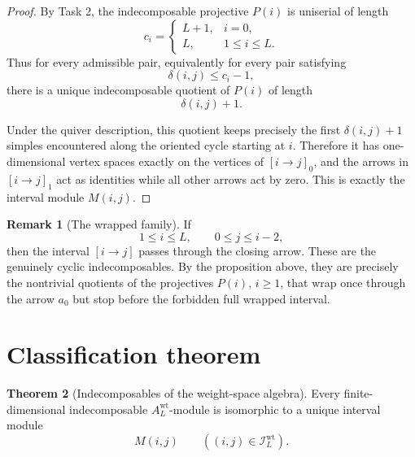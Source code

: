 \documentclass{article}
\theoremstyle{definition}
\newtheorem{theorem}{Theorem}[section]
\newtheorem{remark}[theorem]{Remark}
\begin{document}
\begin{proof}
By Task 2, the indecomposable projective $P(i)$ is uniserial of length
\[
c_i=
\begin{cases}
L+1, & i=0,\\
L, & 1\le i\le L.
\end{cases}
\]
Thus for every admissible pair, equivalently for every pair satisfying
\[
\delta(i,j)\le c_i-1,
\]
there is a unique indecomposable quotient of $P(i)$ of length
\[
\delta(i,j)+1.
\]

Under the quiver description, this quotient keeps precisely the first
$\delta(i,j)+1$ simples encountered along the oriented cycle starting at $i$.
Therefore it has one-dimensional vertex spaces exactly on the vertices of
$[i\to j]_0$, and the arrows in $[i\to j]_1$ act as identities while all other
arrows act by zero. This is exactly the interval module $M(i,j)$.
\end{proof}

\begin{remark}[The wrapped family]
If
\[
1\le i\le L,
\qquad
0\le j\le i-2,
\]
then the interval $[i\to j]$ passes through the closing arrow. These are the
genuinely cyclic indecomposables. By the proposition above, they are precisely
the nontrivial quotients of the projectives $P(i)$, $i\ge 1$, that wrap once
through the arrow $a_0$ but stop before the forbidden full wrapped interval.
\end{remark}

\section{Classification theorem}

\begin{theorem}[Indecomposables of the weight-space algebra]
Every finite-dimensional indecomposable $A_L^{\mathrm{wt}}$-module is
isomorphic to a unique interval module
\[
M(i,j)
\qquad
((i,j)\in \mathcal I_L^{\mathrm{wt}}).
\]
\end{theorem}
\end{document}
